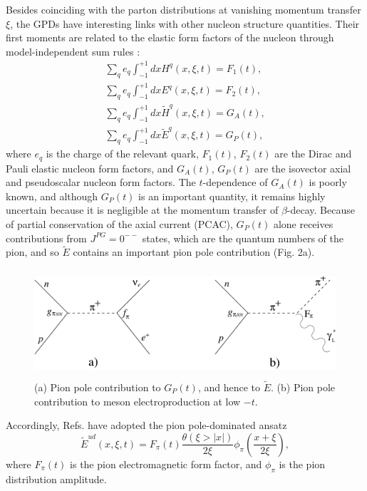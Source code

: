 Besides coinciding with the parton distributions at vanishing momentum transfer
$\xi$, the GPDs have interesting links with other nucleon structure quantities.
Their first moments are related to the elastic form factors of the nucleon
through model-independent sum rules \cite{Ra00}:
\begin{eqnarray}
\sum_q e_q \int^{+1}_{-1} dx H^q(x,\xi,t) = F_1(t),\\
\sum_q e_q \int^{+1}_{-1} dx E^q(x,\xi,t) = F_2(t),\\
\sum_q e_q \int^{+1}_{-1} dx \tilde{H}^q(x,\xi,t) = G_A(t),\\
\sum_q e_q \int^{+1}_{-1} dx \tilde{E}^q(x,\xi,t) = G_P(t),
\end{eqnarray}
where $e_q$ is the charge of the relevant quark, $F_1(t)$, $F_2(t)$ are the
Dirac and Pauli elastic nucleon form factors, and $G_A(t)$, $G_P(t)$ are the
isovector axial and pseudoscalar nucleon form factors.  The $t$-dependence of
$G_A(t)$ is poorly known, and although $G_P(t)$ is an important quantity, it
remains highly uncertain because it is negligible at the momentum transfer of
$\beta$-decay\cite{Th01}.  Because of partial conservation of the axial current
(PCAC), $G_P(t)$ alone
receives contributions from $J^{PG}=0^{--}$ states\cite{Ma69}, which are the
quantum numbers of the pion, and so $\tilde{E}$ contains an important pion pole
contribution (Fig. 2a).

\begin{figure}[hbtp!]
\begin{center}
\includegraphics[height=4cm]{figures/PCAC_pion_pole.pdf}
\end{center}
\caption{\label{fig:PCAC_pion_pole}
(a) Pion pole contribution to $G_P(t)$, and hence to $\tilde{E}$.
(b) Pion pole contribution to meson electroproduction at low $-t$.
}
\end{figure}

Accordingly, Refs. \cite{Pe00,Be01} have adopted the pion pole-dominated
ansatz
\begin{equation}
\tilde{E}^{ud}(x,\xi,t) = F_{\pi}(t)\frac{\theta (\xi>|x|)}{2\xi
}\phi_{\pi}(\frac{x+\xi}{2\xi}),
\end{equation}
where $F_{\pi}(t)$ is the pion electromagnetic form factor, and $\phi_{\pi}$ is
the pion distribution amplitude.

